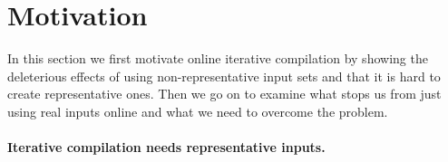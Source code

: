\section{Motivation \label{sec:motivation}}


    In this section we first motivate online iterative compilation by showing the deleterious effects of using non-representative input
    sets and that it is hard to create representative ones. Then we go on to examine what stops us from just using real inputs online and
    what we need to overcome the problem.

    \paragraph{Iterative compilation needs representative inputs.}


